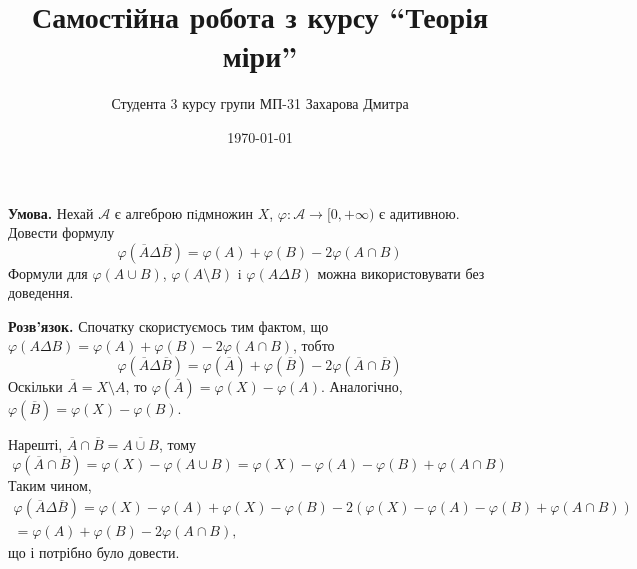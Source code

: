 \documentclass[14pt]{extarticle}
\title{Самостійна робота з курсу ``Теорія міри''}
\author{Студента 3 курсу групи МП-31 Захарова Дмитра}
\date{\today}
\begin{document}
\maketitle

\textbf{Умова.} Нехай $\mathcal{A}$ є алгеброю пiдмножин $X$, $\varphi: \mathcal{A} \to [0,+\infty)$ є адитивною. Довести формулу
\[
\varphi(\overline{A}\Delta \overline{B}) = \varphi(A) + \varphi(B) - 2\varphi(A \cap B)
\]
Формули для $\varphi(A \cup B)$, $\varphi(A \setminus B)$ i $\varphi(A \Delta B)$ можна використовувати без доведення.

\textbf{Розв'язок.} Спочатку скористуємось тим фактом, що $\varphi(A \Delta B) = \varphi(A)+\varphi(B) - 2\varphi(A \cap B)$, тобто
\[
\varphi(\overline{A} \Delta \overline{B}) = \varphi(\overline{A}) + \varphi(\overline{B}) - 2\varphi(\overline{A} \cap \overline{B})
\]
Оскільки $\overline{A} = X \setminus A$, то $\varphi(\overline{A}) = \varphi(X) - \varphi(A)$. Аналогічно, $\varphi(\overline{B}) = \varphi(X) - \varphi(B)$. 

Нарешті, $\overline{A} \cap \overline{B} = \overline{A \cup B}$, тому
\[
\varphi(\overline{A} \cap \overline{B}) = \varphi(X) - \varphi(A \cup B) = \varphi(X) - \varphi(A) - \varphi(B) + \varphi(A \cap B)
\]
Таким чином,
\begin{gather*}
\varphi(\overline{A} \Delta \overline{B}) = \varphi(X) - \varphi(A) + \varphi(X) - \varphi(B) - 2(\varphi(X) - \varphi(A) - \varphi(B) + \varphi(A \cap B)) \\
= \varphi(A) + \varphi(B) - 2\varphi(A \cap B),
\end{gather*}
що і потрібно було довести.
\end{document}
